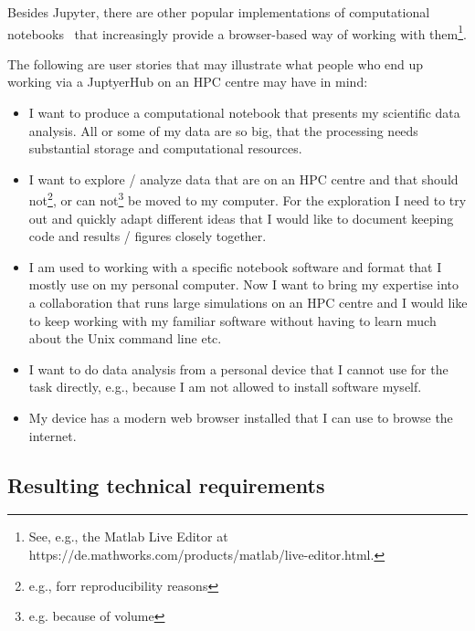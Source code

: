 Besides Jupyter, there are other popular implementations of computational notebooks~\citep{Hinsen2019a} that increasingly provide a browser-based way of working with them\footnote{See, e.g., the Matlab Live Editor at https://de.mathworks.com/products/matlab/live-editor.html.}.

The following are user stories that may illustrate what people who end up working via a JuptyerHub on an HPC centre may have in mind:
\begin{itemize}
  \item I want to produce a computational notebook that presents my scientific data analysis.
  All or some of my data are so big, that the processing needs substantial storage and computational resources.
  \item I want to explore / analyze data that are on an HPC centre and that should not\footnote{e.g., forr reproducibility reasons}, or can not\footnote{e.g. because of volume} be moved to my computer.
  For the exploration I need to try out and quickly adapt different ideas that I would like to document keeping code and results / figures closely together.
  \item I am used to working with a specific notebook software and format that I mostly use on my personal computer.
  Now I want to bring my expertise into a collaboration that runs large simulations on an HPC centre and I would like to keep working with my familiar software without having to learn much about the Unix command line etc.
  \item I want to do data analysis from a personal device that I cannot use for the task directly, e.g., because I am not allowed to install software myself.
  \item My device has a modern web browser installed that I can use to browse the internet.
\end{itemize}


\subsection{Resulting technical requirements}

